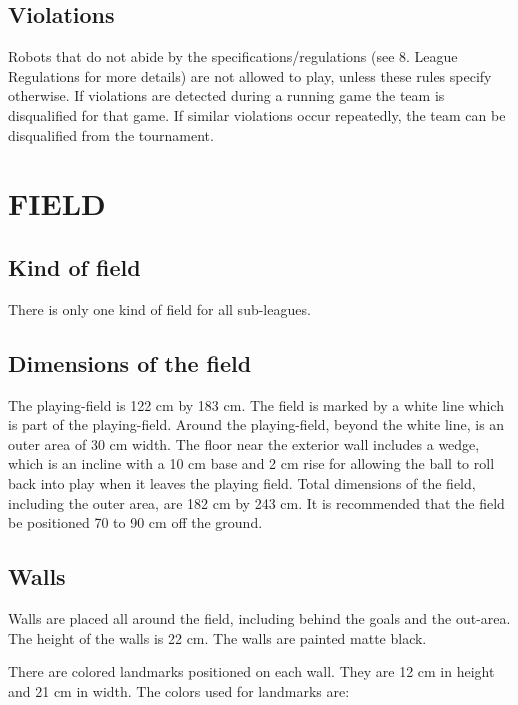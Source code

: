 \documentclass{article}
\begin{document}
\subsection{ Violations \label{ref-027}}

Robots that do not abide by the specifications/regulations (see 8. League
Regulations for more details) are not allowed to play, unless these rules
specify otherwise. If violations are detected during a running game the team is
disqualified for that game. If similar violations occur repeatedly, the team
can be disqualified from the tournament.

\section{FIELD \label{ref-028}}

\subsection{Kind of field \label{ref-029}}

There is only one kind of field for all sub-leagues.

\subsection{ Dimensions of the field \label{ref-030}}

The playing-field is 122 cm by 183 cm. The field is marked by a white line
which is part of the playing-field. Around the playing-field, beyond the white
line, is an outer area of 30 cm width. The floor near the exterior wall
includes a wedge, which is an incline with a 10 cm base and 2 cm rise for
allowing the ball to roll back into play when it leaves the playing field.
Total dimensions of the field, including the outer area, are 182 cm by 243 cm.
It is recommended that the field be positioned 70 to 90 cm off the ground.

\subsection{ Walls \label{ref-031}}

Walls are placed all around the field, including behind the goals and the
out-area. The height of the walls is 22 cm. The walls are painted matte black.

There are colored landmarks positioned on each wall. They are 12 cm in height
and 21 cm in width. The colors used for landmarks are:
\end{document}
